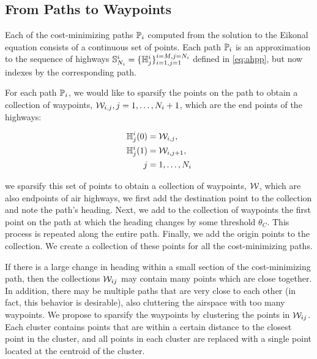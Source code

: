 \subsection{From Paths to Waypoints}
Each of the cost-minimizing paths $\mathbb{P}_i$ computed from the solution to the Eikonal equation consists of a continuous set of points. Each path $\mathbb{P}_i$ is an approximation to the sequence of highways $\mathbb{S}_{N_i}^i = \{\mathbb{H}^i_j\}_{i=1,j=1}^{i=M,j=N_i}$ defined in \eqref{eq:ahpp}, but now indexes by the corresponding path. 

For each path $\mathbb{P}_i$, we would like to sparsify the points on the path to obtain a collection of waypoints, $\mathcal{W}_{i,j}, j = 1,\ldots, N_i+1$, which are the end points of the highways:

\begin{equation}
\begin{aligned}
\mathbb{H}^i_j(0) &= \mathcal{W}_{i,j}, \\
\mathbb{H}^i_j(1) &= \mathcal{W}_{i,j+1}, \\
j &= 1,\ldots,N_i
\end{aligned}
\end{equation}

 we sparsify this set of points to obtain a collection of waypoints, $\mathcal{W}$, which are also endpoints of air highways, we first add the destination point to the collection and note the path's heading. Next, we add to the collection of waypoints the first point on the path at which the heading changes by some threshold $\theta_C$. This process is repeated along the entire path. Finally, we add the origin points to the collection. We create a collection of these points for all the cost-minimizing paths.

If there is a large change in heading within a small section of the cost-minimizing path, then the collections $\mathcal{W}_{ij}$ may contain many points which are close together. In addition, there may be multiple paths that are very close to each other (in fact, this behavior is desirable), also cluttering the airspace with too many waypoints. We propose to sparsify the waypoints by clustering the points in $\mathcal{W}_{ij}$. Each cluster contains points that are within a certain distance to the closest point in the cluster, and all points in each cluster are replaced with a single point located at the centroid of the cluster.